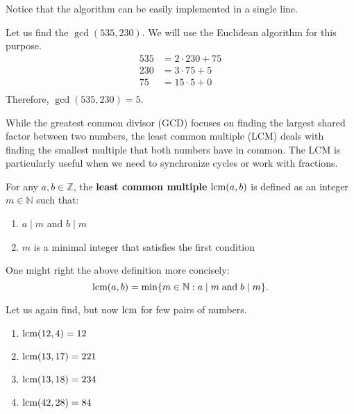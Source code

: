 \documentclass[../lecture-notes-148x210.tex]{subfiles}
\begin{document}
Notice that the algorithm can be easily implemented in a single line.

\begin{example}
    Let us find the $\gcd(535, 230)$. We will use the Euclidean algorithm for this purpose.
    \hfill
    \begin{equation*}
        \begin{aligned}
            535 &= 2 \cdot 230 + 75 \\
            230 &= 3 \cdot 75 + 5 \\
            75 &= 15 \cdot 5 + 0 \\            
        \end{aligned}
    \end{equation*}
    Therefore, $\gcd(535, 230) = 5$.
\end{example}

While the greatest common divisor (GCD) focuses on finding the largest shared factor between two numbers, the least common multiple (LCM) deals with finding the smallest multiple that both numbers have in common. The LCM is particularly useful when we need to synchronize cycles or work with fractions.

\begin{definition}[LCM]
    For any $a, b \in \mathbb{Z}$, the \textbf{least common multiple} $\text{lcm}(a,
    b)$ is defined as an integer $m \in \mathbb{N}$ such that:
    \begin{enumerate}
        \item $a \mid m$ and $b \mid m$
        \item $m$ is a minimal integer that satisfies the first condition 
    \end{enumerate}

    One might right the above definition more concisely:
    \begin{equation*}
        \text{lcm}(a,b) = \min\{m \in \mathbb{N}: a \mid m \; \text{and} \; b \mid m\}.
    \end{equation*}
\end{definition}

\begin{example}
    Let us again find, but now $\text{lcm}$ for few pairs of numbers.
    \hfill
    \begin{multicols}{2}
        \begin{enumerate}
            \item $\text{lcm}(12, 4) = 12$
            \item $\text{lcm}(13, 17) = 221$
            \item $\text{lcm}(13, 18) = 234$
            \item $\text{lcm}(42, 28) = 84$
        \end{enumerate}
    \end{multicols}
\end{example}
\end{document}
